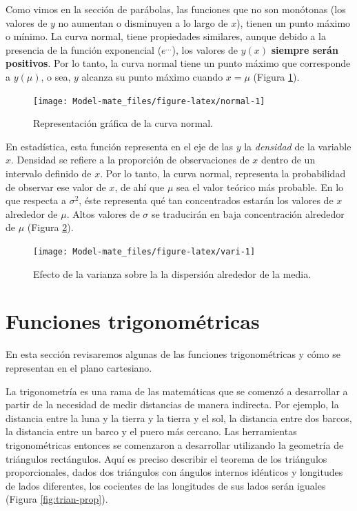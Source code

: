 \documentclass[
]{book}
\begin{document}
Como vimos en la sección de parábolas, las funciones que no son monótonas (los valores de \(y\) no aumentan o disminuyen a lo largo de \(x\)), tienen un punto máximo o mínimo. La curva normal, tiene propiedades similares, aunque debido a la presencia de la función exponencial (\(e^{\dots}\)), los valores de \(y(x)\) \textbf{siempre serán positivos}. Por lo tanto, la curva normal tiene un punto máximo que corresponde a \(y(\mu)\), o sea, \(y\) alcanza su punto máximo cuando \(x=\mu\) (Figura \ref{fig:normal}).

\begin{figure}

{\centering \texttt{[image: Model-mate\_files/figure-latex/normal-1]} 

}

\caption{Representación gráfica de la curva normal.}\label{fig:normal}
\end{figure}

En estadística, esta función representa en el eje de las \(y\) la \emph{densidad} de la variable \(x\). Densidad se refiere a la proporción de observaciones de \(x\) dentro de un intervalo definido de \(x\). Por lo tanto, la curva normal, representa la probabilidad de observar ese valor de \(x\), de ahí que \(\mu\) sea el valor teórico más probable. En lo que respecta a \(\sigma^2\), éste representa qué tan concentrados estarán los valores de \(x\) alrededor de \(\mu\). Altos valores de \(\sigma\) se traducirán en baja concentración alrededor de \(\mu\) (Figura \ref{fig:vari}).

\begin{figure}

{\centering \texttt{[image: Model-mate\_files/figure-latex/vari-1]} 

}

\caption{Efecto de  la varianza sobre la la dispersión alrededor de la media.}\label{fig:vari}
\end{figure}

\hypertarget{funciones-trigonomuxe9tricas}{%
\section{Funciones trigonométricas}\label{funciones-trigonomuxe9tricas}}

En esta sección revisaremos algunas de las funciones trigonométricas y cómo se representan en el plano cartesiano.

La trigonometría es una rama de las matemáticas que se comenzó a desarrollar a partir de la necesidad de medir distancias de manera indirecta. Por ejemplo, la distancia entre la luna y la tierra y la tierra y el sol, la distancia entre dos barcos, la distancia entre un barco y el puero más cercano. Las herramientas trigonométricas entonces se comenzaron a desarrollar utilizando la geometría de triángulos rectángulos. Aquí es preciso describir el teorema de los triángulos proporcionales, dados dos triángulos con ángulos internos idénticos y longitudes de lados diferentes, los cocientes de las longitudes de sus lados serán iguales (Figura \ref{fig:trian-prop}).
\end{document}
